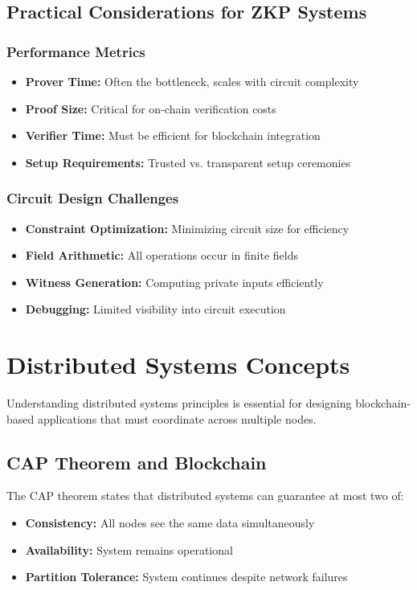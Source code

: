 \subsection{Practical Considerations for ZKP Systems}

\subsubsection{Performance Metrics}
\begin{itemize}
    \item \textbf{Prover Time:} Often the bottleneck, scales with circuit complexity
    \item \textbf{Proof Size:} Critical for on-chain verification costs
    \item \textbf{Verifier Time:} Must be efficient for blockchain integration
    \item \textbf{Setup Requirements:} Trusted vs. transparent setup ceremonies
\end{itemize}

\subsubsection{Circuit Design Challenges}
\begin{itemize}
    \item \textbf{Constraint Optimization:} Minimizing circuit size for efficiency
    \item \textbf{Field Arithmetic:} All operations occur in finite fields
    \item \textbf{Witness Generation:} Computing private inputs efficiently
    \item \textbf{Debugging:} Limited visibility into circuit execution
\end{itemize}

\section{Distributed Systems Concepts}

Understanding distributed systems principles is essential for designing blockchain-based applications that must coordinate across multiple nodes.

\subsection{CAP Theorem and Blockchain}

The CAP theorem states that distributed systems can guarantee at most two of:
\begin{itemize}
    \item \textbf{Consistency:} All nodes see the same data simultaneously
    \item \textbf{Availability:} System remains operational
    \item \textbf{Partition Tolerance:} System continues despite network failures
\end{itemize}

